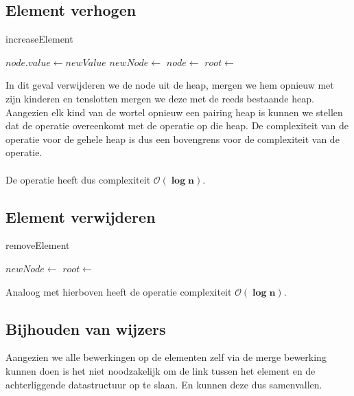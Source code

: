 \documentclass[a4paper,12pt]{report}
\newcommand{\bigO}[1]{$\bm{\mathcal{O}(#1)}$} %
\begin{document}
\subsection{Element verhogen}
\begin{algorithm}[H]
\caption{increaseElement}
\SetAlgoLined	
\DontPrintSemicolon
$node.value \gets newValue$\;
$newNode \gets$\;
$node \gets$\;
$root \gets$\;
\end{algorithm}
In dit geval verwijderen we de node uit de heap, mergen we hem opnieuw met zijn kinderen en tenslotten mergen we deze met de reeds bestaande heap. \\
Aangezien elk kind van de wortel opnieuw een pairing heap is kunnen we stellen dat de  operatie overeenkomt met de  operatie op die heap. De complexiteit van de  operatie voor de gehele heap is dus een bovengrens voor de complexiteit van de  operatie.\\ \\
De  operatie heeft dus complexiteit \bigO{\log n}.
\subsection{Element verwijderen}
\begin{algorithm}[H]
\caption{removeElement}
\SetAlgoLined	
\DontPrintSemicolon
$newNode \gets$\;
$root \gets$\;
\end{algorithm}
Analoog met hierboven heeft de  operatie complexiteit \bigO{\log n}.
\subsection{Bijhouden van wijzers}
Aangezien we alle bewerkingen op de elementen zelf via de merge bewerking kunnen doen is het niet noodzakelijk om de link tussen het element en de achterliggende datastructuur op te slaan. En kunnen deze dus samenvallen.

\end{document}
